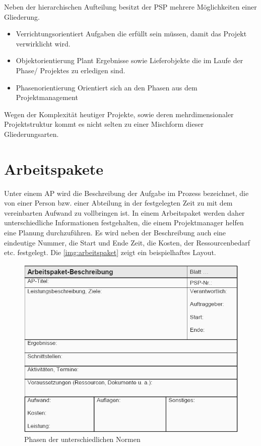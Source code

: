 	Neben der hierarchischen Aufteilung besitzt der \ac{PSP} mehrere Möglichkeiten einer Gliederung. 
	
	\begin{itemize}
		\item Verrichtungsorientiert
			\subitem Aufgaben die erfüllt sein müssen, damit das Projekt verwirklicht wird.
		
		\item Objektorientierung
			\subitem Plant Ergebnisse sowie Lieferobjekte die im Laufe der Phase/ Projektes zu erledigen sind. 
		
		\item Phasenorientierung
			\subitem Orientiert sich an den Phasen aus dem Projektmanagement
	\end{itemize} 

	Wegen der Komplexität heutiger Projekte, sowie deren mehrdimensionaler Projektstruktur kommt es nicht selten zu einer Mischform dieser Gliederungsarten. \autocite[387-391]{Alpar2019}

\section{Arbeitspakete}
\label{sec:arbeitspakete}

	Unter einem \ac{AP} wird die Beschreibung der Aufgabe im Prozess bezeichnet, die von einer Person bzw. einer Abteilung in der festgelegten Zeit zu mit dem vereinbarten Aufwand zu vollbringen ist.\autocite[196]{Känel_2020_Projektphasen} In einem Arbeitspaket werden daher unterschiedliche Informationen festgehalten, die einem Projektmanager helfen eine Planung durchzuführen. Es wird neben der Beschreibung auch eine eindeutige Nummer, die Start und Ende Zeit, die Kosten, der Ressourcenbedarf etc. festgelegt. Die \autoref{img:arbeitspaket} zeigt ein beispielhaftes Layout. 
	
	\begin{figure}[h]
		\centering
		\includegraphics[width=15cm]{img/Arbeitspacket.png}
		\caption{Phasen der unterschiedlichen Normen\autocite[170]{Känel_2020_Projektphasen}}
		\label{img:arbeitspaket}
	\end{figure}
	
	
	
	
	
	
	
	
	
	
	
	
	